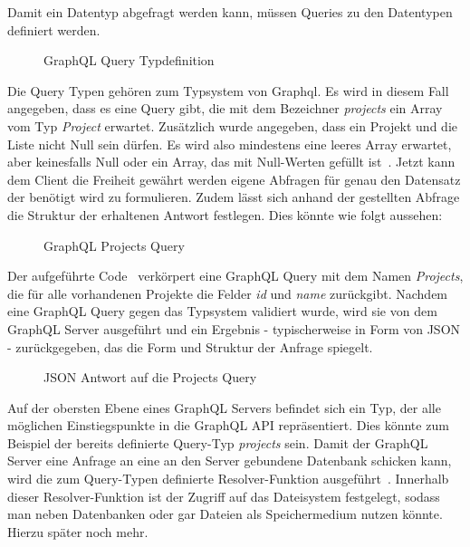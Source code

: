 Damit ein Datentyp abgefragt werden kann, müssen Queries zu den Datentypen definiert werden.

\begin{figure}[h]
    
    \caption{GraphQL Query Typdefinition}
    \label{fig:basics:graphql:5}
\end{figure}

Die Query Typen gehören zum Typsystem von Graphql. Es wird in diesem Fall angegeben, dass es eine Query gibt, die mit dem Bezeichner \emph{projects}
ein Array vom Typ \emph{Project} erwartet. Zusätzlich wurde angegeben, dass ein Projekt und die Liste nicht Null sein dürfen.
Es wird also mindestens eine leeres Array erwartet, aber keinesfalls Null oder ein Array, das mit Null-Werten gefüllt ist~\cite{graphql}.
Jetzt kann dem Client die Freiheit gewährt werden eigene Abfragen für genau den Datensatz der benötigt wird zu formulieren.
Zudem lässt sich anhand der gestellten Abfrage die Struktur der erhaltenen Antwort festlegen. Dies könnte wie folgt aussehen:

\begin{figure}[h]
    
    \caption{GraphQL Projects Query}
    \label{fig:basics:graphql:6}
\end{figure}

Der aufgeführte Code~ verkörpert eine GraphQL Query mit dem Namen \emph{Projects}, die für alle vorhandenen Projekte die Felder \emph{id} und \emph{name}
zurückgibt. Nachdem eine GraphQL Query gegen das Typsystem validiert wurde, wird sie von dem GraphQL Server ausgeführt und
ein Ergebnis - typischerweise in Form von JSON - zurückgegeben, das die Form und Struktur der Anfrage spiegelt.

\begin{figure}[h]
    
    \caption{JSON Antwort auf die Projects Query}
    \label{fig:basics:graphql:7}
\end{figure}

Auf der obersten Ebene eines GraphQL Servers befindet sich ein Typ, der alle möglichen Einstiegspunkte in die GraphQL API repräsentiert.
Dies könnte zum Beispiel der bereits definierte Query-Typ \emph{projects} sein.
Damit der GraphQL Server eine Anfrage an eine an den Server gebundene Datenbank schicken kann, wird die zum Query-Typen definierte
Resolver-Funktion ausgeführt~\cite{graphql-execution}. Innerhalb dieser Resolver-Funktion ist der Zugriff auf das Dateisystem festgelegt, sodass
man neben Datenbanken oder gar Dateien als Speichermedium nutzen könnte. Hierzu später noch mehr.

